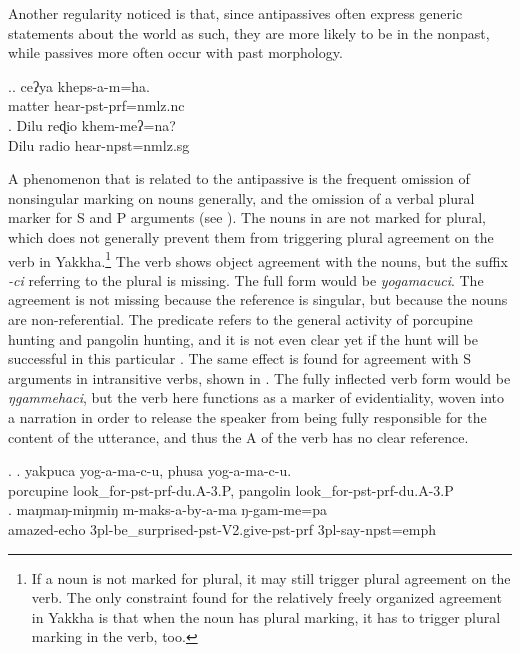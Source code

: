 Another regularity noticed is that, since antipassives often express generic statements about the world as such, they are more likely to be in the nonpast, while passives more often occur with past morphology.
\largerpage

\ex.\ag. ceʔya kheps-a-m=ha.\\
matter hear{\sc [3sg]-pst-prf=nmlz.nc}\\
 
\bg. Dilu  reɖio khem-meʔ=na?\\
Dilu radio  hear{\sc [3sg]-npst=nmlz.sg}\\


A  phenomenon that is related to the antipassive  is the frequent omission of nonsingular marking on nouns generally, and the omission of a verbal plural marker for S and P arguments (see ). The nouns in \Next[a] are not marked for plural, which does  not generally prevent them from triggering plural agreement on the verb in Yakkha.\footnote{If a noun is not marked for plural, it may still trigger plural agreement on the verb. The only constraint found for the relatively freely organized agreement in Yakkha is that when the noun has plural marking, it has to trigger plural marking in the verb, too.} The verb shows object agreement with the nouns, but the suffix \emph{-ci} referring to the plural  is missing. The full form would be  \emph{yogamacuci}. The agreement is not missing because the reference is singular, but because the nouns are non-referential. The predicate refers to the general activity of porcupine hunting and pangolin hunting, and it is not even clear yet if the hunt will be successful in this particular . The same effect is found for agreement with S arguments in intransitive verbs, shown in \Next[b]. The fully inflected verb form would be \emph{ŋgammehaci}, but the verb here functions as a marker of evidentiality, woven into a narration in order to release the speaker from being fully responsible for the content of the utterance, and thus the A of the verb has no clear reference.


\ex. \ag. yakpuca   yog-a-ma-c-u, phusa    yog-a-ma-c-u.\\
porcupine   look\_for{\sc -pst-prf-du.A-3.P}, pangolin   look\_for{\sc -pst-prf-du.A-3.P}\\
 
\bg. maŋmaŋ-miŋmiŋ m-maks-a-by-a-ma ŋ-gam-me=pa\\
	amazed{\sc -echo} {\sc 3pl-}be\_surprised{\sc -pst-V2.give-pst-prf} {\sc 3pl-}say{\sc -npst=emph}\\
	 
	


